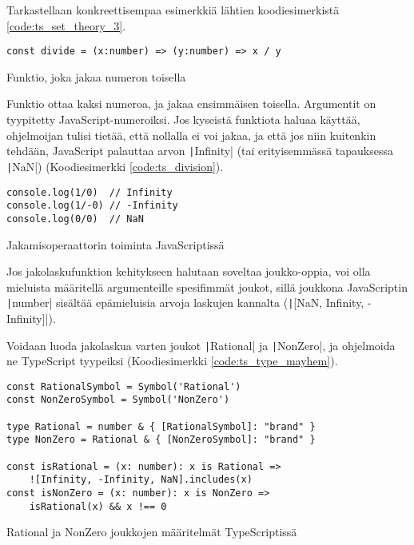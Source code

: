 Tarkastellaan konkreettisempaa esimerkkiä lähtien koodiesimerkistä \ref{code:ts_set_theory_3}.

\begin{code}
    \begin{verbatim}
const divide = (x:number) => (y:number) => x / y
\end{verbatim}
    \caption{Funktio, joka jakaa numeron toisella}
    \label{code:ts_set_theory_3}
\end{code}



Funktio ottaa kaksi numeroa, ja jakaa ensimmäisen toisella. Argumentit on tyypitetty JavaScript-numeroiksi. Jos kyseistä funktiota haluaa käyttää, ohjelmoijan tulisi tietää, että nollalla ei voi jakaa, ja että jos niin kuitenkin tehdään, JavaScript palauttaa arvon \texttt|Infinity| (tai erityisemmässä tapauksessa \texttt|NaN|) (Koodiesimerkki \ref{code:ts_division}).


\begin{code}
    \begin{verbatim}
console.log(1/0)  // Infinity
console.log(1/-0) // -Infinity
console.log(0/0)  // NaN
\end{verbatim}
    \caption{Jakamisoperaattorin toiminta JavaScriptissä}
    \label{code:ts_division}
\end{code}

Jos jakolaskufunktion kehitykseen halutaan soveltaa joukko-oppia, voi olla mieluista määritellä argumenteille spesifimmät joukot, sillä joukkona JavaScriptin \texttt|number| sisältää epämieluisia arvoja laskujen kannalta (\texttt|[NaN, Infinity, -Infinity]|).

Voidaan luoda jakolaskua varten joukot \texttt|Rational| ja \texttt|NonZero|, ja ohjelmoida ne TypeScript tyypeiksi (Koodiesimerkki \ref{code:ts_type_mayhem}).

\begin{code}
    \begin{verbatim}
const RationalSymbol = Symbol('Rational')
const NonZeroSymbol = Symbol('NonZero')

type Rational = number & { [RationalSymbol]: "brand" }
type NonZero = Rational & { [NonZeroSymbol]: "brand" }

const isRational = (x: number): x is Rational => 
    ![Infinity, -Infinity, NaN].includes(x)
const isNonZero = (x: number): x is NonZero => 
    isRational(x) && x !== 0
\end{verbatim}
    \caption{Rational ja NonZero joukkojen määritelmät TypeScriptissä}
    \label{code:ts_type_mayhem}
\end{code}

